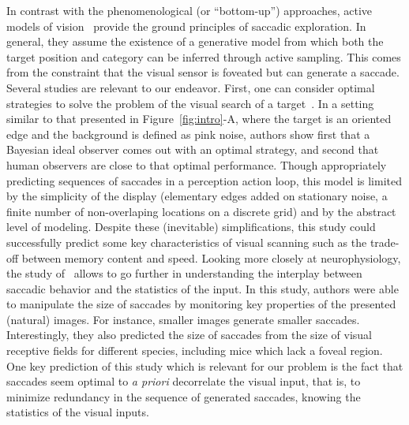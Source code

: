 In contrast with the phenomenological (or ``bottom-up'') approaches, active models of vision~\cite{Najemnik05,Butko2010infomax,dauce2018active} provide the ground principles of saccadic exploration. In general, they assume the existence of a generative model from which both the target position and category can be inferred through active sampling. This comes from the constraint that the visual sensor is foveated but can generate a saccade.
Several studies are relevant to our endeavor. First, one can consider optimal strategies to solve the problem of the visual search of a target~\cite{Najemnik05}. In a setting similar to that presented in Figure~\ref{fig:intro}-A, where the target is an oriented edge and the background is defined as pink noise, authors show first that a Bayesian ideal observer comes out with an optimal strategy, and second that human observers are close to that optimal performance. Though appropriately predicting sequences of saccades in a perception action loop, this model is limited by the simplicity of the display (elementary edges added on stationary noise, a finite number of non-overlaping locations on a discrete grid) and by the abstract level of modeling. Despite these (inevitable) simplifications, this study could successfully predict some key characteristics of visual scanning such as the trade-off between memory content and speed. Looking more closely at neurophysiology, the study of~\cite{Samonds18} allows to go further in understanding the interplay between saccadic behavior and the statistics of the input. In this study, authors were able to manipulate the size of saccades by monitoring key properties of the presented (natural) images. For instance, smaller images generate smaller saccades. Interestingly, they also predicted the size of saccades from the size of visual receptive fields for different species, including mice which lack a foveal region. One key prediction of this study which is relevant for our problem is the fact that saccades seem optimal to \emph{a priori} decorrelate the visual input, that is, to minimize redundancy in the sequence of generated saccades, knowing the statistics of the visual inputs.

